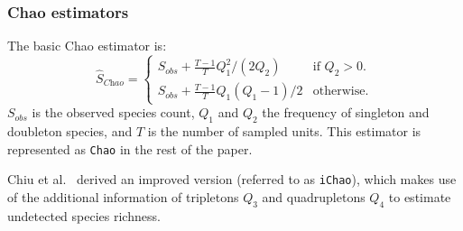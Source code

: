 \documentclass[sigconf,review,anonymous]{acmart}
\newcommand{\Chao}{Chao\xspace}
\newcommand{\chao}{$\hat{S}_\textit{Chao}$\xspace}
\newcounter{todocounter}
\newcommand{\todo}[1]{\marginpar{$|$}\textcolor{red}{\stepcounter{todocounter}\footnote[\thetodocounter]{\textcolor{red}{\textbf{TODO }}\textit{#1}}}}
\def\<#1>{\texttt{#1}}
\renewcommand{\todo}[1]{}
\begin{document}
\subsubsection{Chao estimators~\cite{chao1984nonparametric}}
The basic \Chao estimator
is: %
\begin{displaymath}
\text{\chao}=\begin{cases}
    S_{\textit{obs}} + \frac{T-1}{T} Q_1^2/(2Q_2) & \text{if $Q_2>0$}.\\
    S_{\textit{obs}} + \frac{T-1}{T} Q_1(Q_1-1)/2 & \text{otherwise}.
  \end{cases}
\end{displaymath}
$S_{\textit{obs}}$ is the observed species count,
$Q_1$ and $Q_2$ the frequency of singleton and doubleton species,
and $T$ is the number of sampled units.
This estimator is represented as \<\Chao>
in the rest of the paper.


Chiu et al.~\cite{chiu2014improved} derived an improved version (referred to as \<iChao>), which makes use of the additional
information of tripletons $Q_3$ and quadrupletons $Q_4$ to estimate undetected species richness.
\end{document}
